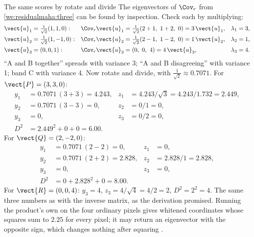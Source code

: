 \begin{worked}[label={we:residualmaha:eigen}]{The same scores by rotate and divide}
The eigenvectors of $\Cov_r$ from \cref{we:residualmaha:three} can be found by inspection. Check each by
multiplying:
\begin{align*}
\vect{u}_1 &= \tfrac{1}{\sqrt2}(1,1,0):& \Cov_r\vect{u}_1 &= \tfrac{1}{\sqrt2}(2+1,\ 1+2,\ 0) = 3\,\vect{u}_1, & \lambda_1 &= 3,\\
\vect{u}_2 &= \tfrac{1}{\sqrt2}(1,-1,0):& \Cov_r\vect{u}_2 &= \tfrac{1}{\sqrt2}(2-1,\ 1-2,\ 0) = 1\,\vect{u}_2, & \lambda_2 &= 1,\\
\vect{u}_3 &= (0,0,1):& \Cov_r\vect{u}_3 &= (0,\ 0,\ 4) = 4\,\vect{u}_3, & \lambda_3 &= 4.
\end{align*}
``A and B together'' spreads with variance 3; ``A and B disagreeing'' with variance 1; band C with variance 4.
Now rotate and divide, with $\tfrac{1}{\sqrt2}\approx0.7071$. For $\vect{P}=(3,3,0)$:
\begin{align*}
y_1 &= 0.7071\,(3+3) = 4.243, & z_1 &= 4.243/\sqrt3 = 4.243/1.732 = 2.449,\\
y_2 &= 0.7071\,(3-3) = 0, & z_2 &= 0/1 = 0,\\
y_3 &= 0, & z_3 &= 0/2 = 0,\\
D^2 &= 2.449^2+0+0 = 6.00.
\end{align*}
For $\vect{Q}=(2,-2,0)$:
\begin{align*}
y_1 &= 0.7071\,(2-2) = 0, & z_1 &= 0,\\
y_2 &= 0.7071\,(2+2) = 2.828, & z_2 &= 2.828/1 = 2.828,\\
y_3 &= 0, & z_3 &= 0,\\
D^2 &= 0+2.828^2+0 = 8.00.
\end{align*}
For $\vect{R}=(0,0,4)$: $y_3=4$, $z_3=4/\sqrt4=4/2=2$, $D^2=2^2=4$. The same three numbers as with the
inverse matrix, as the derivation promised. Running the product's own  on the four ordinary
pixels gives whitened coordinates whose squares sum to $2.25$ for every pixel; it may return an eigenvector
with the opposite sign, which changes nothing after squaring \tagC.
\end{worked}



